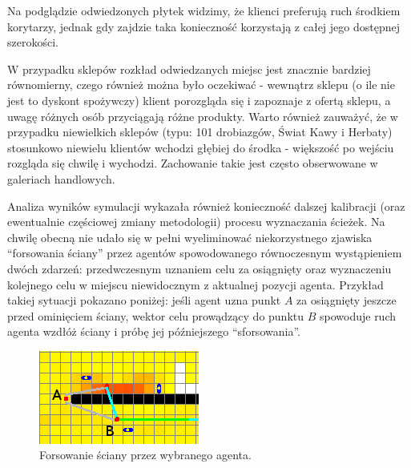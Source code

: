 \documentclass[a4paper, 12pt]{article}
\begin{document}
Na podglądzie odwiedzonych płytek widzimy, że klienci preferują ruch środkiem korytarzy, jednak gdy zajdzie taka konieczność korzystają z całej jego dostępnej szerokości.

W przypadku sklepów rozkład odwiedzanych miejsc jest znacznie bardziej równomierny, czego również można było oczekiwać - wewnątrz sklepu (o ile nie jest to dyskont spożywczy) klient porozgląda się i zapoznaje z ofertą sklepu, a uwagę różnych osób przyciągają różne produkty. Warto również zauważyć, że w przypadku niewielkich sklepów (typu: 101 drobiazgów, Świat Kawy i Herbaty) stosunkowo niewielu klientów wchodzi głębiej do środka - większość po wejściu rozgląda się chwilę i wychodzi. Zachowanie takie jest często obserwowane w galeriach handlowych.

Analiza wyników symulacji wykazała również konieczność dalszej kalibracji (oraz ewentualnie częściowej zmiany metodologii) procesu wyznaczania ścieżek. Na chwilę obecną nie udało się w pełni wyeliminować niekorzystnego zjawiska ``forsowania ściany'' przez agentów spowodowanego równoczesnym wystąpieniem dwóch zdarzeń: przedwczesnym uznaniem celu za osiągnięty oraz wyznaczeniu kolejnego celu w miejscu niewidocznym z aktualnej pozycji agenta. Przykład takiej sytuacji pokazano poniżej: jeśli agent uzna punkt $A$ za osiągnięty jeszcze przed ominięciem ściany, wektor celu prowądzący do punktu $B$ spowoduje ruch agenta wzdłóż ściany i próbę jej późniejszego ``sforsowania''.

\begin{figure}[H]
  \centering
  \includegraphics[scale=0.7]{./img/wallsmasher.png}
  \caption{Forsowanie ściany przez wybranego agenta.}
  \label{fig:bug-wallsmasher}
\end{figure}
\end{document}
